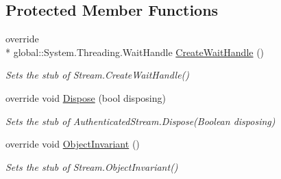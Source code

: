 \subsection*{Protected Member Functions}
\begin{DoxyCompactItemize}
\item 
override \\*
global\-::\-System.\-Threading.\-Wait\-Handle \hyperlink{class_system_1_1_net_1_1_security_1_1_fakes_1_1_stub_authenticated_stream_ac11343aa3847efa257eefc1eeb25b436}{Create\-Wait\-Handle} ()
\begin{DoxyCompactList}\small\item\em Sets the stub of Stream.\-Create\-Wait\-Handle()\end{DoxyCompactList}\item 
override void \hyperlink{class_system_1_1_net_1_1_security_1_1_fakes_1_1_stub_authenticated_stream_ab18f5afcd7239d3efb6ddcef751e079c}{Dispose} (bool disposing)
\begin{DoxyCompactList}\small\item\em Sets the stub of Authenticated\-Stream.\-Dispose(\-Boolean disposing)\end{DoxyCompactList}\item 
override void \hyperlink{class_system_1_1_net_1_1_security_1_1_fakes_1_1_stub_authenticated_stream_a7afb0153807b8254b6f81d4f3fa10527}{Object\-Invariant} ()
\begin{DoxyCompactList}\small\item\em Sets the stub of Stream.\-Object\-Invariant()\end{DoxyCompactList}\end{DoxyCompactItemize}
